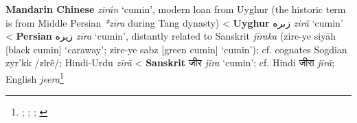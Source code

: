 \begin{etymology}\label{ety:ziran}
\textbf{Mandarin Chinese}  \textit{zī​rán} `cumin', modern loan from Uyghur (the historic term is  from Middle Persian \textit{*zīra} during Tang dynasty)
< \textbf{Uyghur} {زىرە} \textit{zirä} `cumin'
< \textbf{Persian} {زیره} \textit{zīra} `cumin', distantly related to Sanskrit \textit{jīraka} (zire-ye siyāh [black cumin] `caraway'; zire-ye sabz [green cumin] `cumin'); cf. cognates Sogdian zyr'kk /zîrê/; Hindi-Urdu \textit{zīrā}
< \textbf{Sanskrit} {जीर} \textit{jīra} `cumin'; cf. Hindi जीरा \textit{jīrā}; English \textit{jeera}\footnote{\textcites[383]{laufer_sino-iranica_1919}[45]{sulaiman_uyghur_2020}[]{liu_hanyu_1985}; \textcite[561]{schwarz_uyghur-english_1992}; \textcite[634]{steingass_comprehensive_1892}; \textcites[375]{mcgregor_oxford_1993}}
\end{etymology}